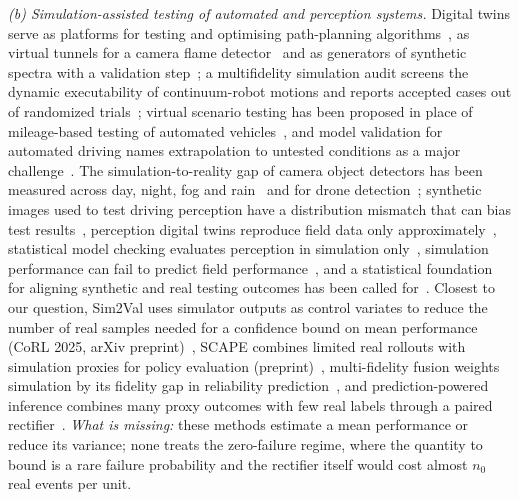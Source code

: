 \emph{(b) Simulation-assisted testing of automated and perception systems.} Digital twins serve as platforms for
testing and optimising path-planning algorithms~\cite{wang2025dtplatform}, as virtual tunnels for a camera flame
detector~\cite{li2025flamedt} and as generators of synthetic spectra with a validation step~\cite{nosenko2026gammadt};
a multifidelity simulation audit screens the dynamic executability of continuum-robot motions and reports
accepted cases out of randomized trials~\cite{wang2026simaudit}; virtual scenario
testing has been proposed in place of mileage-based testing of automated vehicles~\cite{riedmaier2020}, and model
validation for automated driving names extrapolation to untested conditions as a major challenge~\cite{riedmaier2021vvuq}.
The simulation-to-reality gap of camera object detectors has been measured across day, night, fog and
rain~\cite{reway2020simgap} and for drone detection~\cite{dieter2023drone}; synthetic images used to test driving
perception have a distribution mismatch that can bias test results~\cite{amini2024translators}, perception digital twins
reproduce field data only approximately~\cite{saad2025dtperception}, statistical model checking evaluates perception in
simulation only~\cite{barbier2019smc}, simulation performance can fail to predict field performance~\cite{kadian2020},
and a statistical foundation for aligning synthetic and real testing outcomes has been called
for~\cite{zhao2025statfoundation}. Closest to our question, Sim2Val uses simulator outputs as control variates to reduce
the number of real samples needed for a confidence bound on mean performance (CoRL 2025, arXiv
preprint)~\cite{luo2025sim2val}, SCAPE combines limited real rollouts with simulation proxies for policy evaluation
(preprint)~\cite{zhu2026scape}, multi-fidelity fusion weights simulation by its fidelity gap in reliability
prediction~\cite{wang2026fusion}, and prediction-powered inference combines many proxy outcomes with few real labels
through a paired rectifier~\cite{angelopoulos2023ppi,fisch2024stratppi}. \emph{What is missing:} these methods estimate
a mean performance or reduce its variance; none treats the zero-failure regime, where the quantity to bound is a rare
failure probability and the rectifier itself would cost almost $n_0$ real events per unit.

